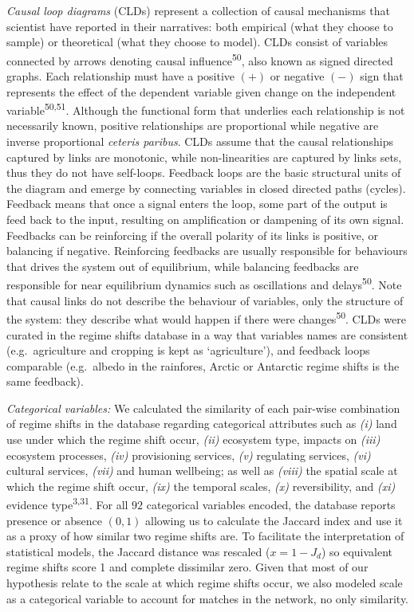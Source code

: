 \documentclass[9pt,]{article}
\begin{document}
\emph{Causal loop diagrams} (CLDs) represent a collection of causal
mechanisms that scientist have reported in their narratives: both
empirical (what they choose to sample) or theoretical (what they choose
to model). CLDs consist of variables connected by arrows denoting causal
influence\textsuperscript{50}, also known as signed directed graphs.
Each relationship must have a positive \((+)\) or negative \((-)\) sign
that represents the effect of the dependent variable given change on the
independent variable\textsuperscript{50,51}. Although the functional
form that underlies each relationship is not necessarily known, positive
relationships are proportional while negative are inverse proportional
\emph{ceteris paribus}. CLDs assume that the causal relationships
captured by links are monotonic, while non-linearities are captured by
links sets, thus they do not have self-loops. Feedback loops are the
basic structural units of the diagram and emerge by connecting variables
in closed directed paths (cycles). Feedback means that once a signal
enters the loop, some part of the output is feed back to the input,
resulting on amplification or dampening of its own signal. Feedbacks can
be reinforcing if the overall polarity of its links is positive, or
balancing if negative. Reinforcing feedbacks are usually responsible for
behaviours that drives the system out of equilibrium, while balancing
feedbacks are responsible for near equilibrium dynamics such as
oscillations and delays\textsuperscript{50}. Note that causal links do
not describe the behaviour of variables, only the structure of the
system: they describe what would happen if there were
changes\textsuperscript{50}. CLDs were curated in the regime shifts
database in a way that variables names are consistent (e.g.~agriculture
and cropping is kept as `agriculture'), and feedback loops comparable
(e.g.~albedo in the rainfores, Arctic or Antarctic regime shifts is the
same feedback).

\emph{Categorical variables:} We calculated the similarity of each
pair-wise combination of regime shifts in the database regarding
categorical attributes such as \emph{(i)} land use under which the
regime shift occur, \emph{(ii)} ecosystem type, impacts on \emph{(iii)}
ecosystem processes, \emph{(iv)} provisioning services, \emph{(v)}
regulating services, \emph{(vi)} cultural services, \emph{(vii)} and
human wellbeing; as well as \emph{(viii)} the spatial scale at which the
regime shift occur, \emph{(ix)} the temporal scales, \emph{(x)}
reversibility, and \emph{(xi)} evidence type\textsuperscript{3,31}. For
all \(92\) categorical variables encoded, the database reports presence
or absence \((0,1)\) allowing us to calculate the Jaccard index and use
it as a proxy of how similar two regime shifts are. To facilitate the
interpretation of statistical models, the Jaccard distance was rescaled
(\(x =1 - J_{d}\)) so equivalent regime shifts score 1 and complete
dissimilar zero. Given that most of our hypothesis relate to the scale
at which regime shifts occur, we also modeled scale as a categorical
variable to account for matches in the network, no only similarity.
\end{document}
